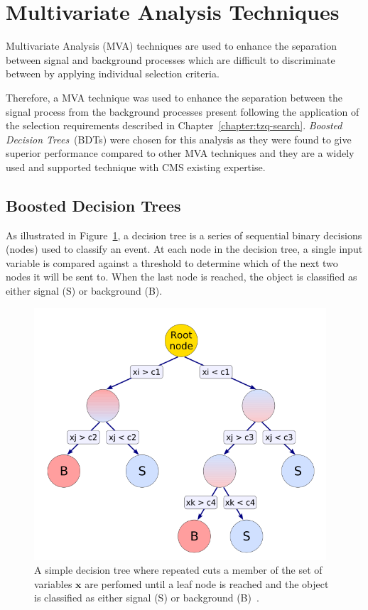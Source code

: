\section{Multivariate Analysis Techniques}\label{sec:mvas}
Multivariate Analysis (MVA) techniques are used to enhance the separation between signal and background processes which are difficult to discriminate between by applying individual selection criteria.

Therefore, a MVA technique was used to enhance the separation between the signal process from the background processes present following the application of the selection requirements described in Chapter~\ref{chapter:tzq-search}.
\emph{Boosted Decision Trees}~(BDTs) were chosen for this analysis as they were found to give superior performance compared to other MVA techniques and they are a widely used and supported technique with CMS existing expertise.

\subsection{Boosted Decision Trees}\label{subsec:bdt}
As illustrated in Figure~\ref{fig:decisionTree}, a decision tree is a series of sequential binary decisions (nodes) used to classify an event.
At each node in the decision tree, a single input variable is compared against a threshold to determine which of the next two nodes it will be sent to.
When the last node is reached, the object is classified as either signal (S) or background (B).

\begin{figure}[htb]
\centering
\includegraphics[width=0.97\textwidth]{figs/background-estimation/decisionTree.pdf}
\caption{A simple decision tree where repeated cuts a member of the set of variables $\textbf{x}$ are perfomed until a leaf node is reached and the object is classified as either signal (S) or background (B)~\cite{Hocker:2007ht}.
}
\label{fig:decisionTree}
\end{figure}

